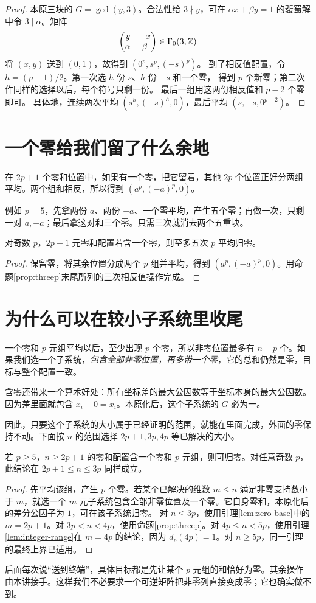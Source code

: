 \begin{proof}
本原三块的 $G=\gcd(y,3)$。合法性给 $3\nmid y$，可在 $\alpha x+\beta y=1$ 的裴蜀解中令 $3\mid\alpha$。矩阵
\[
\begin{pmatrix}y&-x\\\alpha&\beta\end{pmatrix}\in\Gamma_0(3,\mathbb Z)
\]
将 $(x,y)$ 送到 $(0,1)$，故得到 $(0^p,s^p,(-s)^p)$。
到了相反值配置，令 $h=(p-1)/2$。第一次选 $h$ 份 $s$、$h$ 份 $-s$ 和一个零，
得到 $p$ 个新零；第二次作同样的选择以后，每个符号只剩一份。
最后一组用这两份相反值和 $p-2$ 个零即可。
具体地，连续两次平均 $(s^h,(-s)^h,0)$，最后平均 $(s,-s,0^{p-2})$。
\end{proof}

\section{一个零给我们留了什么余地}
在 $2p+1$ 个零和位置中，如果有一个零，把它留着，其他 $2p$ 个位置正好分两组平均。两个组和相反，所以得到 $(a^p,(-a)^p,0)$。

例如 $p=5$，先拿两份 $a$、两份 $-a$、一个零平均，产生五个零；再做一次，只剩一对 $a,-a$；最后拿这对和三个零。只需三次就消去两个五重块。
\begin{lemma}\label{lem:zero-base}
对奇数 $p$，$2p+1$ 元零和配置若含一个零，则至多五次 $p$ 平均归零。
\end{lemma}
\begin{proof}
保留零，将其余位置分成两个 $p$ 组并平均，得到 $(a^p,(-a)^p,0)$。用命题\ref{prop:threep}末尾所列的三次相反值操作完成。
\end{proof}

\section{为什么可以在较小子系统里收尾}
一个零和 $p$ 元组平均以后，至少出现 $p$ 个零，所以非零位置最多有 $n-p$ 个。如果我们选一个子系统，\emph{包含全部非零位置，再多带一个零}，它的总和仍然是零，目标与整个配置一致。

含零还带来一个算术好处：所有坐标差的最大公因数等于坐标本身的最大公因数。因为差里面就包含 $x_i-0=x_i$。本原化后，这个子系统的 $G$ 必为一。

因此，只要这个子系统的大小属于已经证明的范围，就能在里面完成，外面的零保持不动。下面按 $n$ 的范围选择 $2p+1,3p,4p$ 等已解决的大小。
\begin{lemma}[从一个零和组到全部归零]\label{lem:zero-tail}
若 $p\ge5$，$n\ge2p+1$ 的零和配置含一个零和 $p$ 元组，则可归零。对任意奇数 $p$，此结论在 $2p+1\le n\le3p$ 同样成立。
\end{lemma}
\begin{proof}
先平均该组，产生 $p$ 个零。若某个已解决的维数 $m\le n$ 满足非零支持数小于 $m$，就选一个 $m$ 元子系统包含全部非零位置及一个零。它自身零和，本原化后的差分公因子为 $1$，可在该子系统归零。
对 $n\le3p$，使用引理\ref{lem:zero-base}中的 $m=2p+1$。对 $3p<n<4p$，使用命题\ref{prop:threep}。对 $4p\le n<5p$，使用引理\ref{lem:integer-range}在 $m=4p$ 的结论，因为 $d_p(4p)=1$。对 $n\ge5p$，同一引理的最终上界已适用。
\end{proof}

后面每次说“送到终端”，具体目标都是先让某个 $p$ 元组的和恰好为零。其余操作由本讲接手。这样我们不必要求一个可逆矩阵把非零列直接变成零；它也确实做不到。
